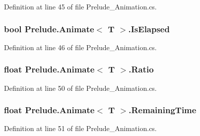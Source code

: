Definition at line 45 of file Prelude\+\_\+\+Animation.\+cs.

\hypertarget{class_prelude_1_1_animate_3_01_t_01_4_a45ee613c6c0487c1d2f4fc605c51c2f6}{
\subsubsection[{Is\+Elapsed}]{\setlength{\rightskip}{0pt plus 5cm}bool Prelude.\+Animate$<$ T $>$.Is\+Elapsed\hspace{0.3cm}{\ttfamily [get]}}}\label{class_prelude_1_1_animate_3_01_t_01_4_a45ee613c6c0487c1d2f4fc605c51c2f6}


Definition at line 46 of file Prelude\+\_\+\+Animation.\+cs.

\hypertarget{class_prelude_1_1_animate_3_01_t_01_4_a6d6f38d9e50d753d306ffc886ae4565e}{
\subsubsection[{Ratio}]{\setlength{\rightskip}{0pt plus 5cm}float Prelude.\+Animate$<$ T $>$.Ratio\hspace{0.3cm}{\ttfamily [get]}}}\label{class_prelude_1_1_animate_3_01_t_01_4_a6d6f38d9e50d753d306ffc886ae4565e}


Definition at line 50 of file Prelude\+\_\+\+Animation.\+cs.

\hypertarget{class_prelude_1_1_animate_3_01_t_01_4_a7406c94b3a721528662898108f5ca5ca}{
\subsubsection[{Remaining\+Time}]{\setlength{\rightskip}{0pt plus 5cm}float Prelude.\+Animate$<$ T $>$.Remaining\+Time\hspace{0.3cm}{\ttfamily [get]}}}\label{class_prelude_1_1_animate_3_01_t_01_4_a7406c94b3a721528662898108f5ca5ca}


Definition at line 51 of file Prelude\+\_\+\+Animation.\+cs.


